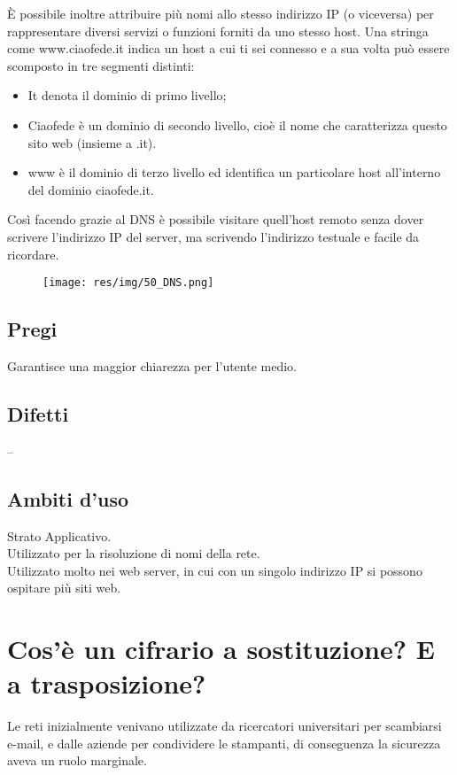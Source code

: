 È possibile inoltre attribuire più nomi allo stesso indirizzo IP (o viceversa) per rappresentare diversi servizi o funzioni forniti da uno stesso host.
Una stringa come www.ciaofede.it indica un host a cui ti sei connesso e a sua volta può essere scomposto in tre segmenti distinti:
\begin{itemize}
\item	It denota il dominio di primo livello;
\item	Ciaofede è un dominio di secondo livello, cioè il nome che caratterizza questo sito web (insieme a .it).
\item	www è il dominio di terzo livello ed identifica un particolare host all'interno del dominio ciaofede.it.
\end{itemize}
Così facendo grazie al DNS è possibile visitare quell'host remoto senza dover scrivere l'indirizzo IP del server, ma scrivendo l'indirizzo testuale e facile da ricordare.

\begin{figure}[H]
\centering
\texttt{[image: res/img/50\_DNS.png]}
\end{figure}

\subsection{Pregi}
Garantisce una maggior chiarezza per l'utente medio.

\subsection{Difetti}
--
\subsection{Ambiti d'uso}
Strato Applicativo.\\
Utilizzato per la risoluzione di nomi della rete.\\
Utilizzato molto nei web server, in cui con un singolo indirizzo IP si possono ospitare più siti web.

\section{Cos'è un cifrario a sostituzione? E a trasposizione?}

Le reti inizialmente venivano utilizzate da ricercatori universitari per scambiarsi e-mail, e dalle aziende per condividere le stampanti, di conseguenza la sicurezza aveva un ruolo marginale.

